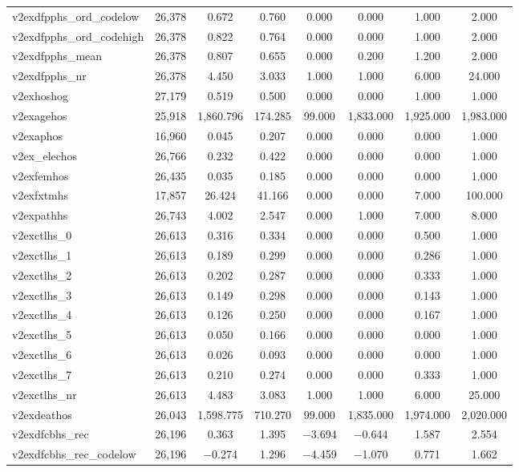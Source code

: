 \begin{table}[!htbp]
\begin{tabular}{@{\extracolsep{5pt}}lccccccc}
v2exdfpphs\_ord\_codelow & 26,378 & 0.672 & 0.760 & 0.000 & 0.000 & 1.000 & 2.000 \\ 
v2exdfpphs\_ord\_codehigh & 26,378 & 0.822 & 0.764 & 0.000 & 0.000 & 1.000 & 2.000 \\ 
v2exdfpphs\_mean & 26,378 & 0.807 & 0.655 & 0.000 & 0.200 & 1.200 & 2.000 \\ 
v2exdfpphs\_nr & 26,378 & 4.450 & 3.033 & 1.000 & 1.000 & 6.000 & 24.000 \\ 
v2exhoshog & 27,179 & 0.519 & 0.500 & 0.000 & 0.000 & 1.000 & 1.000 \\ 
v2exagehos & 25,918 & 1,860.796 & 174.285 & 99.000 & 1,833.000 & 1,925.000 & 1,983.000 \\ 
v2exaphos & 16,960 & 0.045 & 0.207 & 0.000 & 0.000 & 0.000 & 1.000 \\ 
v2ex\_elechos & 26,766 & 0.232 & 0.422 & 0.000 & 0.000 & 0.000 & 1.000 \\ 
v2exfemhos & 26,435 & 0.035 & 0.185 & 0.000 & 0.000 & 0.000 & 1.000 \\ 
v2exfxtmhs & 17,857 & 26.424 & 41.166 & 0.000 & 0.000 & 7.000 & 100.000 \\ 
v2expathhs & 26,743 & 4.002 & 2.547 & 0.000 & 1.000 & 7.000 & 8.000 \\ 
v2exctlhs\_0 & 26,613 & 0.316 & 0.334 & 0.000 & 0.000 & 0.500 & 1.000 \\ 
v2exctlhs\_1 & 26,613 & 0.189 & 0.299 & 0.000 & 0.000 & 0.286 & 1.000 \\ 
v2exctlhs\_2 & 26,613 & 0.202 & 0.287 & 0.000 & 0.000 & 0.333 & 1.000 \\ 
v2exctlhs\_3 & 26,613 & 0.149 & 0.298 & 0.000 & 0.000 & 0.143 & 1.000 \\ 
v2exctlhs\_4 & 26,613 & 0.126 & 0.250 & 0.000 & 0.000 & 0.167 & 1.000 \\ 
v2exctlhs\_5 & 26,613 & 0.050 & 0.166 & 0.000 & 0.000 & 0.000 & 1.000 \\ 
v2exctlhs\_6 & 26,613 & 0.026 & 0.093 & 0.000 & 0.000 & 0.000 & 1.000 \\ 
v2exctlhs\_7 & 26,613 & 0.210 & 0.274 & 0.000 & 0.000 & 0.333 & 1.000 \\ 
v2exctlhs\_nr & 26,613 & 4.483 & 3.083 & 1.000 & 1.000 & 6.000 & 25.000 \\ 
v2exdeathos & 26,043 & 1,598.775 & 710.270 & 99.000 & 1,835.000 & 1,974.000 & 2,020.000 \\ 
v2exdfcbhs\_rec & 26,196 & 0.363 & 1.395 & $-$3.694 & $-$0.644 & 1.587 & 2.554 \\ 
v2exdfcbhs\_rec\_codelow & 26,196 & $-$0.274 & 1.296 & $-$4.459 & $-$1.070 & 0.771 & 1.662 \\ 

\end{tabular}
\end{table}
